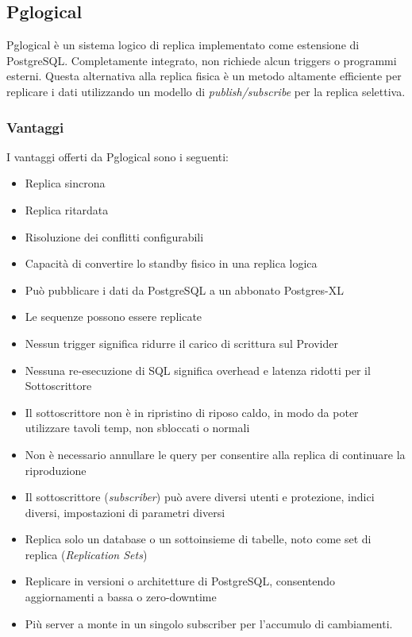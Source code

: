 \item
\subsection{Pglogical}
Pglogical \`{e} un sistema logico di replica implementato come estensione di PostgreSQL. Completamente integrato, non richiede alcun triggers o programmi esterni. Questa alternativa alla replica fisica \`{e} un metodo altamente efficiente per replicare i dati utilizzando un modello di \textit{publish/subscribe} per la replica selettiva.\cite{etichetta3}

\subsubsection{Vantaggi}
I vantaggi offerti da Pglogical sono i seguenti:
\begin{itemize}
\item
Replica sincrona
\item
Replica ritardata
\item
Risoluzione dei conflitti configurabili
\item
Capacit\`{a} di convertire lo standby fisico in una replica logica
\item
Pu\`{o} pubblicare i dati da PostgreSQL a un abbonato Postgres-XL
\item
Le sequenze possono essere replicate
\item
Nessun trigger significa ridurre il carico di scrittura sul Provider
\item
Nessuna re-esecuzione di SQL significa overhead e latenza ridotti per il Sottoscrittore
\item
Il sottoscrittore non \`{e} in ripristino di riposo caldo, in modo da poter utilizzare tavoli temp, non sbloccati o normali
\item
Non \`{e} necessario annullare le query per consentire alla replica di continuare la riproduzione
\item
Il sottoscrittore (\textit{subscriber}) pu\`{o} avere diversi utenti e protezione, indici diversi, impostazioni di parametri diversi
\item
Replica solo un database o un sottoinsieme di tabelle, noto come set di replica (\textit{Replication Sets})
\item
Replicare in versioni o architetture di PostgreSQL, consentendo aggiornamenti a bassa o zero-downtime
\item
Pi\`{u} server a monte in un singolo subscriber per l'accumulo di cambiamenti.\cite{etichetta3}
\end{itemize}

